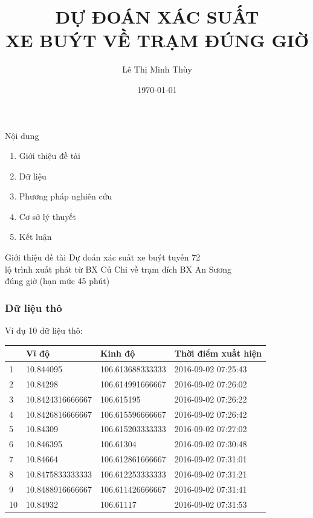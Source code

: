 \documentclass[t]{beamer}
\title[Dự đoán xác suất xe buýt về trạm đúng giờ]{DỰ ĐOÁN XÁC SUẤT \\XE BUÝT VỀ TRẠM ĐÚNG GIỜ} %
\author[Lê Thị Minh Thùy]{Lê Thị Minh Thùy} %
\institute[] %
{
Đại Học Bách Khoa TPHCM \\ %
\medskip
}
\date{\today} %
\begin{document}
\begin{frame}
\titlepage %
\end{frame}

\begin{frame}{Nội dung}
\begin{enumerate}
\item Giới thiệu đề tài
\item Dữ liệu
\item Phương pháp nghiên cứu
\item Cơ sở lý thuyết
\item Kết luận
\end{enumerate}
\end{frame}

\begin{frame}[c]{ Giới thiệu đề tài}
\centering
Dự đoán xác suất xe buýt tuyến 72 \\ lộ trình xuất phát từ BX Củ Chi về trạm đích BX An Sương \\ đúng giờ (hạn mức 45 phút)
\end{frame}


\begin{frame}[t]
\frametitle{Dữ liệu thô}
Ví dụ 10 dữ liệu thô:\\
\begin{flushleft}
\begin{tabular}{ |l|l|l|l| }
\hline
&Vĩ độ & Kinh độ & Thời điểm xuất hiện \\ 
\hline
1&10.844095 & 106.613688333333 & 2016-09-02 07:25:43 \\ 
\hline
2&10.84298 & 106.614991666667 & 2016-09-02 07:26:02 \\
\hline
3&10.8424316666667 & 106.615195 & 2016-09-02 07:26:22 \\
\hline
4&10.8426816666667 & 106.615596666667 & 2016-09-02 07:26:42 \\
\hline
5&10.84309 & 106.615203333333 & 2016-09-02 07:27:02 \\
\hline
6&10.846395 & 106.61304 & 2016-09-02 07:30:48 \\
\hline
7&10.84664 & 106.612861666667 & 2016-09-02 07:31:01 \\
\hline
8&10.8475833333333 & 106.612253333333 & 2016-09-02 07:31:21 \\
\hline
9&10.8488916666667 & 106.611426666667 & 2016-09-02 07:31:41 \\
\hline
10&10.84932 & 106.61117 & 2016-09-02 07:31:53 \\
\hline 
\end{tabular}
\end{flushleft}
\end{frame}
\end{document}
